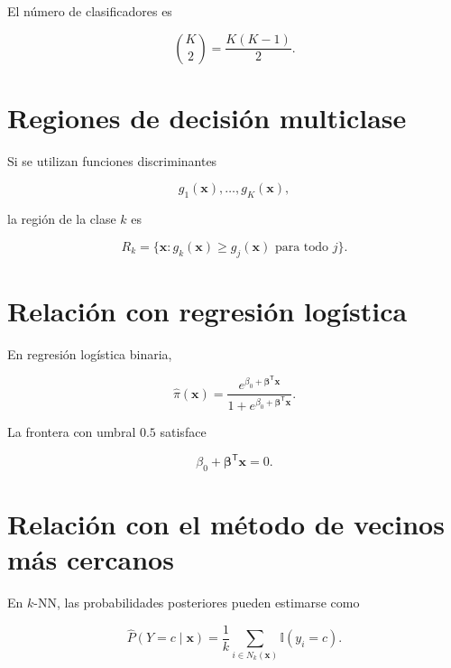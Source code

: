 \documentclass[
  spanish,
  10.5pt,
  letterpaper,
  DIV=11,
  numbers=noendperiod,
  oneside,
  open=any]{scrreprt}
\theoremstyle{definition}
\theoremstyle{definition}
\theoremstyle{plain}
\theoremstyle{remark}
\begin{document}
El número de clasificadores es

\[
\binom{K}{2}
=
\frac{K(K-1)}{2}.
\]

\section*{Regiones de decisión
multiclase}\label{regiones-de-decisiuxf3n-multiclase}


Si se utilizan funciones discriminantes

\[
g_1(\mathbf{x}),\ldots,g_K(\mathbf{x}),
\]

la región de la clase \(k\) es

\[
R_k
=
\{
\mathbf{x}
:
g_k(\mathbf{x})
\geq
g_j(\mathbf{x})
\text{ para todo }j
\}.
\]

\section*{Relación con regresión
logística}\label{relaciuxf3n-con-regresiuxf3n-loguxedstica-3}


En regresión logística binaria,

\[
\widehat{\pi}(\mathbf{x})
=
\frac{
e^{\beta_0+\boldsymbol{\beta}^{\mathsf T}\mathbf{x}}
}{
1+
e^{\beta_0+\boldsymbol{\beta}^{\mathsf T}\mathbf{x}}
}.
\]

La frontera con umbral \(0.5\) satisface

\[
\beta_0
+
\boldsymbol{\beta}^{\mathsf T}\mathbf{x}
=
0.
\]

\section*{Relación con el método de vecinos más
cercanos}\label{relaciuxf3n-con-el-muxe9todo-de-vecinos-muxe1s-cercanos-1}


En \(k\)-NN, las probabilidades posteriores pueden estimarse como

\[
\widehat{P}(Y=c\mid\mathbf{x})
=
\frac{1}{k}
\sum_{i\in N_k(\mathbf{x})}
\mathbb{I}(y_i=c).
\]
\end{document}
